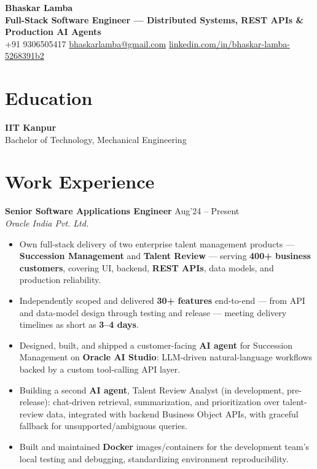 \documentclass[10pt,a4paper]{article}
\newcommand{\resumeItem}[1]{\item[\textcolor{primary}{\textbullet}] #1}
\begin{document}
\begin{center}
    {\LARGE\bfseries Bhaskar Lamba}\\[4pt]
    {\small\color{primary}\bfseries Full-Stack Software Engineer --- Distributed Systems, REST APIs \& Production AI Agents}\\[3pt]
    \small
    +91 9306505417 \quad\textbar\quad
    \href{mailto:bhaskarlamba@gmail.com}{bhaskarlamba@gmail.com} \quad\textbar\quad
    \href{https://www.linkedin.com/in/bhaskar-lamba-5268391b2/}{linkedin.com/in/bhaskar-lamba-5268391b2}
\end{center}
\vspace{6pt}

\section{Education}
\small
\textbf{IIT Kanpur} \hfill {}\\
Bachelor of Technology, Mechanical Engineering

\section{Work Experience}
\small

\textbf{Senior Software Applications Engineer} \hfill Aug'24 -- Present\\
\textit{Oracle India Pvt. Ltd.}
\begin{itemize}[leftmargin=1.05em, nosep, topsep=0pt, itemsep=0pt, parsep=0pt]
    \resumeItem{Own full-stack delivery of two enterprise talent management products --- \textbf{Succession Management} and \textbf{Talent Review} --- serving \textbf{400+ business customers}, covering UI, backend, \textbf{REST APIs}, data models, and production reliability.}
    \resumeItem{Independently scoped and delivered \textbf{30+ features} end-to-end --- from API and data-model design through testing and release --- meeting delivery timelines as short as \textbf{3--4 days}.}
    \resumeItem{Designed, built, and shipped a customer-facing \textbf{AI agent} for Succession Management on \textbf{Oracle AI Studio}: LLM-driven natural-language workflows backed by a custom tool-calling API layer.}
    \resumeItem{Building a second \textbf{AI agent}, Talent Review Analyst (in development, pre-release): chat-driven retrieval, summarization, and prioritization over talent-review data, integrated with backend Business Object APIs, with graceful fallback for unsupported/ambiguous queries.}
    \resumeItem{Built and maintained \textbf{Docker} images/containers for the development team's local testing and debugging, standardizing environment reproducibility.}
\end{itemize}
\end{document}
